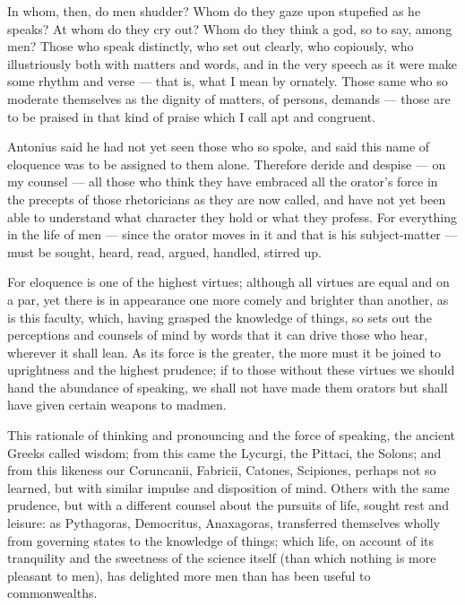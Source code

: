  In whom, then, do men shudder? Whom do they gaze upon stupefied as he speaks? At whom do they cry out? Whom do they think a god, so to say, among men? Those who speak distinctly, who set out clearly, who copiously, who illustriously both with matters and words, and in the very speech as it were make some rhythm and verse — that is, what I mean by ornately. Those same who so moderate themselves as the dignity of matters, of persons, demands — those are to be praised in that kind of praise which I call apt and congruent.

 Antonius said he had not yet seen those who so spoke, and said this name of eloquence was to be assigned to them alone. Therefore deride and despise — on my counsel — all those who think they have embraced all the orator's force in the precepts of those rhetoricians as they are now called, and have not yet been able to understand what character they hold or what they profess. For everything in the life of men — since the orator moves in it and that is his subject-matter — must be sought, heard, read, argued, handled, stirred up.

 For eloquence is one of the highest virtues; although all virtues are equal and on a par, yet there is in appearance one more comely and brighter than another, as is this faculty, which, having grasped the knowledge of things, so sets out the perceptions and counsels of mind by words that it can drive those who hear, wherever it shall lean. As its force is the greater, the more must it be joined to uprightness and the highest prudence; if to those without these virtues we should hand the abundance of speaking, we shall not have made them orators but shall have given certain weapons to madmen.

 This rationale of thinking and pronouncing and the force of speaking, the ancient Greeks called wisdom; from this came the Lycurgi, the Pittaci, the Solons; and from this likeness our Coruncanii, Fabricii, Catones, Scipiones, perhaps not so learned, but with similar impulse and disposition of mind. Others with the same prudence, but with a different counsel about the pursuits of life, sought rest and leisure: as Pythagoras, Democritus, Anaxagoras, transferred themselves wholly from governing states to the knowledge of things; which life, on account of its tranquility and the sweetness of the science itself (than which nothing is more pleasant to men), has delighted more men than has been useful to commonwealths.

